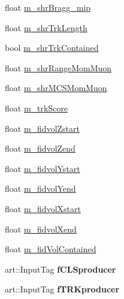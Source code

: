 \begin{DoxyCompactItemize}
\item 
float \hyperlink{classselection_1_1CCincSelection_a0d588b58345d52cc13a398bb3f6ff2fd}{m\+\_\+shr\+Bragg\+\_\+mip}
\item 
float \hyperlink{classselection_1_1CCincSelection_a09db29c4170084b4c366defeb3330de8}{m\+\_\+shr\+Trk\+Length}
\item 
bool \hyperlink{classselection_1_1CCincSelection_a5cde5d5c0d798594d11f082dadaf52bc}{m\+\_\+shr\+Trk\+Contained}
\item 
float \hyperlink{classselection_1_1CCincSelection_a5dff6f4a03bc26649697adbd38241be3}{m\+\_\+shr\+Range\+Mom\+Muon}
\item 
float \hyperlink{classselection_1_1CCincSelection_a752b664543c799d4afd1ee195091ff1c}{m\+\_\+shr\+M\+C\+S\+Mom\+Muon}
\item 
float \hyperlink{classselection_1_1CCincSelection_a2c3b80516e3731ec9b4f5ccbee6864ba}{m\+\_\+trk\+Score}
\item 
float \hyperlink{classselection_1_1CCincSelection_a291cc5986c0861bf1883ec1c41457afd}{m\+\_\+fidvol\+Zstart}
\item 
float \hyperlink{classselection_1_1CCincSelection_a2510a29ed7584b2d56eb8dff636ceee6}{m\+\_\+fidvol\+Zend}
\item 
float \hyperlink{classselection_1_1CCincSelection_a28900415eda1eb30d6263081e943e6a5}{m\+\_\+fidvol\+Ystart}
\item 
float \hyperlink{classselection_1_1CCincSelection_a01d6a0608356e4ea245f23e1b6934fd3}{m\+\_\+fidvol\+Yend}
\item 
float \hyperlink{classselection_1_1CCincSelection_aab38faac4866d19339aadbc3ac1eb55b}{m\+\_\+fidvol\+Xstart}
\item 
float \hyperlink{classselection_1_1CCincSelection_ae4bab4cf8ea55e54fcdaa66d2fe44c1d}{m\+\_\+fidvol\+Xend}
\item 
float \hyperlink{classselection_1_1CCincSelection_a3412d86b03a97a65fed3d5d8a41ed2c0}{m\+\_\+fid\+Vol\+Contained}
\item 
art\+::\+Input\+Tag {\bfseries f\+C\+L\+Sproducer}\hypertarget{classselection_1_1CCincSelection_aa068a963cfe008cf151aaf36ac1be0cb}{}\label{classselection_1_1CCincSelection_aa068a963cfe008cf151aaf36ac1be0cb}

\item 
art\+::\+Input\+Tag {\bfseries f\+T\+R\+Kproducer}\hypertarget{classselection_1_1CCincSelection_af9ccce4bb19f88858234cb039c52c6dc}{}\label{classselection_1_1CCincSelection_af9ccce4bb19f88858234cb039c52c6dc}


\end{DoxyCompactItemize}
